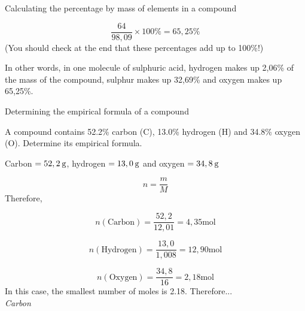 \begin{wex}{Calculating the percentage by mass of elements in a compound }
{    \begin{equation}
    \frac{64}{98,09}\ensuremath{\times}100\%=65,25\%\tag{18.22}
      \end{equation}
      \label{m38712*id280876}(You should check at the end that these percentages add up to 100\%!)\par 
      \label{m38712*id280880}In other words, in one molecule of sulphuric acid, hydrogen makes up 2,06\% of the mass of the compound, sulphur makes up 32,69\% and oxygen makes up 65,25\%.\par 
}
    \end{wex}
    \noindent
\label{m38712*secfhsst!!!underscore!!!id1029}\vspace{.5cm} 
      \noindent 
      \begin{wex}{Determining the empirical formula of a compound }{
      \label{m38712*probfhsst!!!underscore!!!id1030}
      \label{m38712*id280897}A compound contains 52.2\% carbon ($\mathrm{C}$), 13.0\% hydrogen ($\mathrm{H}$) and 34.8\% oxygen ($\mathrm{O}$). Determine its empirical formula.\par 
      \vspace{5pt}
}
{ %
      \label{m38712*id280928}Carbon $=52,2\phantom{\rule{2pt}{0ex}}\mathrm{g}$, hydrogen $=13,0\phantom{\rule{2pt}{0ex}}\mathrm{g}$ and oxygen $=34,8\phantom{\rule{2pt}{0ex}}\mathrm{g}$\par 
      \label{m38712*id280954}\nopagebreak\noindent{}
        
    \begin{equation}
    n=\frac{m}{M}\tag{18.23}
      \end{equation}
      \label{m38712*id280975}Therefore,\par 
      \label{m38712*id280978}\nopagebreak\noindent{}
        
    \begin{equation}
    n\left(\mathrm{Carbon}\right)=\frac{52,2}{12,01}=4,35\mathrm{mol}\tag{18.24}
      \end{equation}
      \label{m38712*id281042}\nopagebreak\noindent{}
        
    \begin{equation}
    n\left(\mathrm{Hydrogen}\right)=\frac{13,0}{1,008}=12,90\mathrm{mol}\tag{18.25}
      \end{equation}
      \label{m38712*id281111}\nopagebreak\noindent{}
        
    \begin{equation}
    n\left(\mathrm{Oxygen}\right)=\frac{34,8}{16}=2,18\mathrm{mol}\tag{18.26}
      \end{equation}
In this case, the smallest number of moles is 2.18. Therefore... \\ 
      \label{m38712*id281179}
        \textsl{Carbon}
      \par 
      \label{m38712*id281185}\nopagebreak\noindent{}
        
}
\end{wex}
